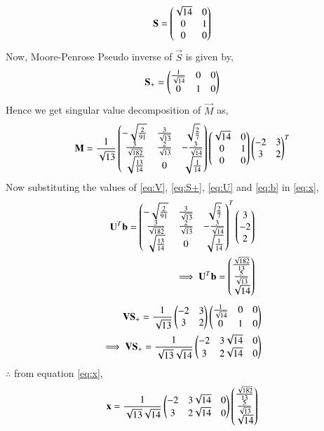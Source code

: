 \documentclass[journal,12pt,twocolumn]{IEEEtran}
\begin{document}
\begin{align}
\mathbf{S} = \begin{pmatrix}\sqrt{14}&0\\0&1\\0&0\end{pmatrix}
\end{align}
Now, Moore-Penrose Pseudo inverse of $\vec{S}$ is given by,
\begin{align}
\mathbf{S}_+ = \begin{pmatrix}\frac{1}{\sqrt{14}}&0&0\\0&1&0\end{pmatrix}\label{eq:S+}
\end{align}
Hence we get singular value decomposition of $\vec{M}$ as,
\begin{align}
\mathbf{M} = \frac{1}{\sqrt{13}}\begin{pmatrix}-\sqrt{\frac{2}{91}} &\frac{3}{\sqrt{13}} & \sqrt{\frac{2}{7}}\\\frac{3}{\sqrt{182}} &\frac{2}{\sqrt{13}} &-\frac{3}{\sqrt{14}} \\\sqrt{\frac{13}{14}} &0 & \sqrt{\frac{1}{14}}\end{pmatrix}\begin{pmatrix}\sqrt{14}&0\\0&1\\0&0\end{pmatrix}\begin{pmatrix}-2&3\\3&2\end{pmatrix}^T
\end{align}
Now substituting the values of \eqref{eq:V}, \eqref{eq:S+}, \eqref{eq:U} and \eqref{eq:b} in \eqref{eq:x},
\begin{align}
\mathbf{U}^T\mathbf{b} = \begin{pmatrix}-\sqrt{\frac{2}{91}} &\frac{3}{\sqrt{13}} & \sqrt{\frac{2}{7}}\\\frac{3}{\sqrt{182}} &\frac{2}{\sqrt{13}} &-\frac{3}{\sqrt{14}} \\\sqrt{\frac{13}{14}} &0 & \sqrt{\frac{1}{14}}\end{pmatrix}^T\begin{pmatrix}3\\-2\\2\end{pmatrix}\\
\implies \mathbf{U}^T\mathbf{b} = \begin{pmatrix}\frac{\sqrt{182}}{13}\\\frac{5}{\sqrt{13}}\\\sqrt{14}\end{pmatrix}\label{eq:Utb}
\end{align}
\begin{align}
\mathbf{V}\mathbf{S}_+ = \frac{1}{\sqrt{13}}\begin{pmatrix}-2&3\\3&2\end{pmatrix}\begin{pmatrix}\frac{1}{\sqrt{14}}&0&0\\0&1&0\end{pmatrix}\\
\implies \mathbf{V}\mathbf{S}_+ =\frac{1}{\sqrt{13}\sqrt{14}}\begin{pmatrix}-2&3\sqrt{14}&0\\3&2\sqrt{14}&0\end{pmatrix}
\end{align}
$\therefore$ from equation \eqref{eq:x},
\begin{align}
\mathbf{x} = \frac{1}{\sqrt{13}\sqrt{14}}\begin{pmatrix}-2&3\sqrt{14}&0\\3&2\sqrt{14}&0\end{pmatrix} \begin{pmatrix}\frac{\sqrt{182}}{13}\\\frac{5}{\sqrt{13}}\\\sqrt{14}\end{pmatrix}\label{eq:fx}
\end{align} 
\end{document}
